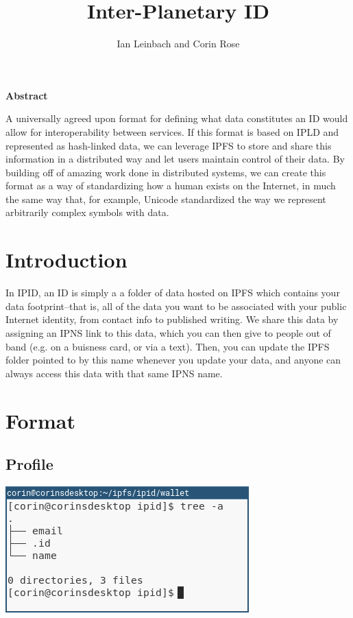\documentclass{article}
\author{Ian Leinbach and Corin Rose}
\title{Inter-Planetary ID}
\begin{document}
\maketitle

\begin{center}
\textbf{Abstract} 
\end{center}

A universally agreed upon format for defining what data constitutes an ID would allow for interoperability between services. If this format is based on IPLD and represented as hash-linked data, we can leverage IPFS to store and share this information in a distributed way and let users maintain control of their data. By building off of amazing work done in distributed systems, we can create this format as a way of standardizing how a human exists on the Internet, in much the same way that, for example, Unicode standardized the way we represent arbitrarily complex symbols with data.  

\section{Introduction}
In IPID, an ID is simply a a folder of data hosted on IPFS which contains your data footprint--that is, all of the data you want to be associated with your public Internet identity, from contact info to published writing. We share this data by assigning an IPNS link to this data, which you can then give to people out of band (e.g. on a buisness card, or via a text). Then, you can update the IPFS folder pointed to by this name whenever you update your data, and anyone can always access this data with that same IPNS name. 

\section{Format}

\subsection{Profile}

\begin{center}
  \includegraphics[width=.5\textwidth]{resources/basic_profile.png}
\end{center}
\end{document}
